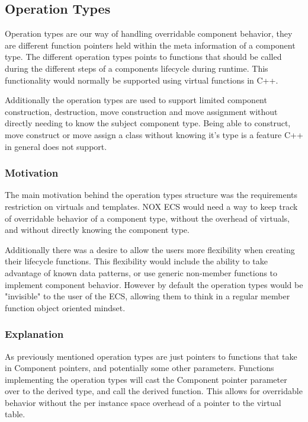 \subsection{Operation Types}
\label{subsec:detailed_operation_types}
Operation types are our way of handling overridable component behavior,
they are different function pointers held within the meta information of a component type.
The different operation types points to functions that should be called during the different steps
of a components lifecycle during runtime.
This functionality would normally be supported using virtual functions in C++.

Additionally the operation types are used to support limited component construction, destruction,
move construction and move assignment without directly needing to know the subject component type.
Being able to construct, move construct or move assign a class without knowing it's type is a feature
C++ in general does not support. 

\subsubsection{Motivation}
The main motivation behind the operation types structure was the requirements restriction on virtuals and templates. 
NOX ECS would need a way to keep track of overridable behavior of a component type, without the overhead of virtuals,
and without directly knowing the component type.

Additionally there was a desire to allow the users more flexibility when creating their lifecycle functions.
This flexibility would include the ability to take advantage of known data patterns,
or use generic non-member functions to implement component behavior.
However by default the operation types would be "invisible" to the user of the ECS,
allowing them to think in a regular member function object oriented mindset.

\subsubsection{Explanation}
As previously mentioned operation types are just pointers to functions that take in Component pointers,
and potentially some other parameters.
Functions implementing the operation types will cast the Component pointer parameter over to the derived type,
and call the derived function.
This allows for overridable behavior without the per instance space overhead of a pointer to the virtual table.

